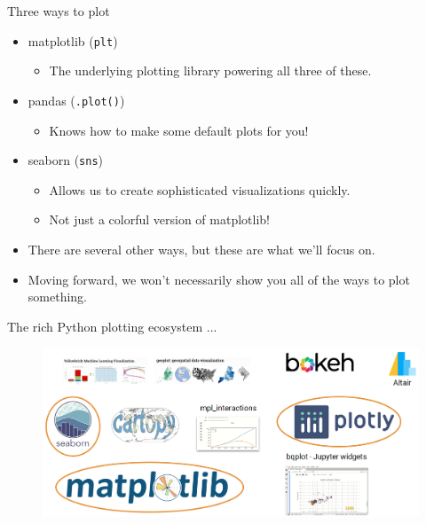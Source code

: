 \documentclass[aspectratio=169]{../latex_main/tntbeamer}  %
\begin{document}
	\begin{frame}{Three ways to plot}
	    \begin{itemize}
	        \item matplotlib (\texttt{plt})
	        \begin{itemize}
	            \item The underlying plotting library powering all three of these.
	        \end{itemize}
	        \item pandas (\texttt{.plot()})
	        \begin{itemize}
	            \item Knows how to make some default plots for you!
	        \end{itemize}
	        \item seaborn (\texttt{sns})
	        \begin{itemize}
	            \item Allows us to create sophisticated visualizations quickly.
	            \item Not just a colorful version of matplotlib!
	        \end{itemize}
	        \item There are several other ways, but these are what we’ll focus on.
	        \item Moving forward, we won’t necessarily show you all of the ways to plot something.
	    \end{itemize}
	\end{frame}
	
	\begin{frame}{The rich Python plotting ecosystem ...}
	    \begin{figure}
	        \centering
	        \includegraphics[scale=.38]{Bild24}
	    \end{figure}
	\end{frame}
	
\end{document}

